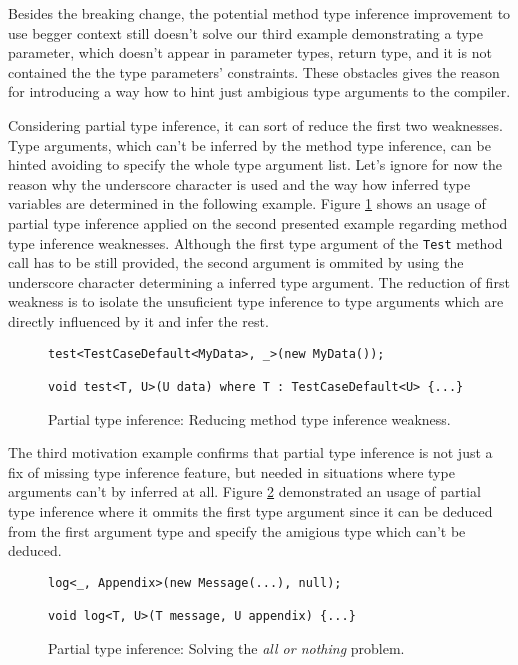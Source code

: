 \par
{}
Besides the breaking change, the potential method type inference improvement to use begger context still doesn't solve our third example demonstrating a type parameter, which doesn't appear in parameter types, return type, and it is not contained the the type parameters' constraints.
These obstacles gives the reason for introducing a way how to hint just ambigious type arguments to the compiler.
\par
{}
Considering partial type inference, it can sort of reduce the first two weaknesses.
Type arguments, which can't be inferred by the method type inference, can be hinted avoiding to specify the whole type argument list.
Let's ignore for now the reason why the underscore character is used and the way how inferred type variables are determined in the following example.
Figure \ref{img32:sol1} shows an usage of partial type inference applied on the second presented example regarding method type inference weaknesses.
Although the first type argument of the \texttt{Test} method call has to be still provided, the second argument is ommited by using the underscore character determining a inferred type argument.
The reduction of first weakness is to isolate the unsuficient type inference to type arguments which are directly influenced by it and infer the rest.
\begin{figure}[h]
\begin{lstlisting}[style=csharp]
test<TestCaseDefault<MyData>, _>(new MyData());

void test<T, U>(U data) where T : TestCaseDefault<U> {...}
\end{lstlisting}
\caption{Partial type inference: Reducing method type inference weakness.}
\label{img32:sol1}
\end{figure}
\par
{}
The third motivation example confirms that partial type inference is not just a fix of missing type inference feature, but needed in situations where type arguments can't by inferred at all.
Figure \ref{img33:sol2} demonstrated an usage of partial type inference where it ommits the first type argument since it can be deduced from the first argument type and specify the amigious type which can't be deduced. 
\begin{figure}[h]
\begin{lstlisting}[style=csharp]
log<_, Appendix>(new Message(...), null);

void log<T, U>(T message, U appendix) {...}
\end{lstlisting}
\caption{Partial type inference: Solving the \textit{all or nothing} problem.}
\label{img33:sol2}
\end{figure}
